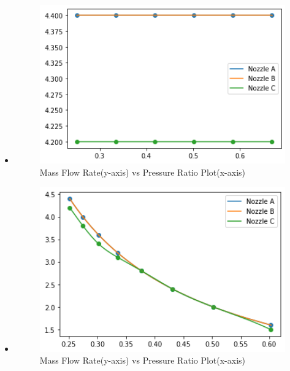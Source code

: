 \begin{itemize}
    \item {}
    \begin{figure}[!h]
    \centering
    \includegraphics[width=12cm]{figure 7.png}
    \caption{Mass Flow Rate(y-axis) vs Pressure Ratio Plot(x-axis)}
\end{figure}

    \item {}
    \begin{figure}[!h]
    \centering
    \includegraphics[width=12cm]{figure 8.png}
    \caption{Mass Flow Rate(y-axis) vs Pressure Ratio Plot(x-axis)}
\end{figure}
\end{itemize}




    
